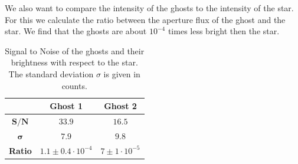 We also want to compare the intensity of the ghosts to the intensity of the star. For this we calculate the ratio between the aperture flux of the ghost and the star. We find that the ghosts are about $10^{-4}$ times less bright then the star. 
\begin{table}[H] 
\centering
\begin{tabular}{|c|c|c|}
\hline
 & \textbf{Ghost 1} & \textbf{Ghost 2}\\
\hline
$\mathbf{S/N}$ & $33.9$ & $16.5$\\
\hline
$\mathbf{\sigma}$ & $7.9$ & $9.8$\\ 
\hline
\textbf{Ratio} & $1.1 \pm 0.4 \cdot 10^{-4}$ & $7 \pm 1 \cdot 10^{-5}$\\
\hline
\end{tabular}
\caption{Signal to Noise of the ghosts and their brightness with respect to the star. The standard deviation $\sigma$ is given in counts.}
\label{table:ghosts}
\end{table}
